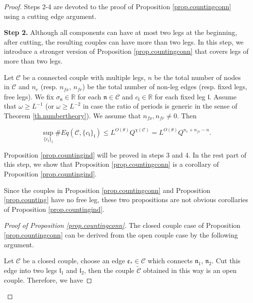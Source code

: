 \begin{proof}
    Steps 2-4 are devoted to the proof of Proposition \ref{prop.countingconn} using a cutting edge argument. 
    
    
    \textbf{Step 2.} Although all components can have at most two legs at the beginning, after cutting, the resulting couples can have more than two legs. In this step, we introduce a stronger version of Proposition \ref{prop.countingconn} that covers legs of more than two legs.
    
    \begin{lem}\label{prop.countingind}
    Let $\mathcal{C}$ be a connected couple with multiple legs, $n$ be the total number of nodes in $\mathcal{C}$ and $n_e$ (resp. $n_{\textit{fx}}$, $n_{\textit{fr}}$) be the total number of non-leg edges (resp. fixed legs, free legs). We fix $\sigma_{\mathfrak{n}}\in\mathbb{R}$ for each $\mathfrak{n}\in \mathcal{C}$ and $c_{\mathfrak{l}}\in \mathbb{R}$ for each fixed leg $\mathfrak{l}$. Assume that $\omega\ge L^{-1}$ (or $\omega\ge L^{-2}$ in case the ratio of periods is generic in the sense of Theorem \ref{th.numbertheory}). We assume that $n_{\textit{fx}},n_{\textit{fr}}\ne 0$. Then 
    
    \begin{equation}\label{eq.countingbd3}
    \sup_{\{c_{\mathfrak{l}}\}_{\mathfrak{l}}}\#Eq(\mathcal{C},\{c_{\mathfrak{l}}\}_{\mathfrak{l}})\leq L^{O(\theta)} Q^{\chi(\mathcal{C})} = L^{O(\theta)} Q^{n_e+n_{\textit{fr}}-n}.
    \end{equation}
    
    \end{lem}
    
    Proposition \ref{prop.countingind} will be proved in steps 3 and 4. In the rest part of this step, we show that Proposition \ref{prop.countingconn} is a corollary of Proposition \ref{prop.countingind}.
    
    Since the couples in Proposition \ref{prop.countingconn} and Proposition \ref{prop.counting} have no free leg, these two propositions are not obvious corollaries of Proposition \ref{prop.countingind}.
    
    \begin{proof}[Proof of Proposition \ref{prop.countingconn}]
    The closed couple case of Proposition \ref{prop.countingconn} can be derived from the open couple case by the following argument.
    
    Let $\mathcal{C}$ be a closed couple, choose an edge $\mathfrak{e}_{*}\in \mathcal{C}$ which connects $\mathfrak{n}_1$, $\mathfrak{n}_2$. Cut this edge into two legs $\mathfrak{l}_1$ and $\mathfrak{l}_2$, then the couple $\widetilde{\mathcal{C}}$ obtained in this way is an open couple. Therefore, we have
    

\end{proof}
\end{proof}
